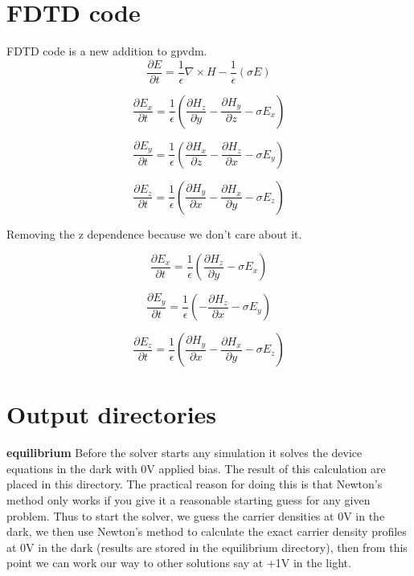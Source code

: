 \documentclass[11pt]{article}
\begin{document}
\newpage

\section{FDTD code}
FDTD code is a new addition to gpvdm.
\begin{equation}
\frac{\partial E}{\partial t}= \frac{1}{\epsilon} \nabla \times H - \frac{1}{\epsilon} (\sigma E) 
\end{equation}


\begin{equation}
\frac{\partial E_x}{\partial t}= \frac{1}{\epsilon}(\frac{\partial H_z}{\partial y}-\frac{\partial H_y}{\partial z}-\sigma E_x) 
\end{equation}

\begin{equation}
\frac{\partial E_y}{\partial t}= \frac{1}{\epsilon}(\frac{\partial H_x}{\partial z}-\frac{\partial H_z}{\partial x}-\sigma E_y) 
\end{equation}

\begin{equation}
\frac{\partial E_z}{\partial t}= \frac{1}{\epsilon}(\frac{\partial H_y}{\partial x}-\frac{\partial H_x}{\partial y}-\sigma E_z) 
\end{equation}

Removing the z dependence because we don't care about it.

\begin{equation}
\frac{\partial E_x}{\partial t}= \frac{1}{\epsilon}(\frac{\partial H_z}{\partial y}-\sigma E_x) 
\end{equation}

\begin{equation}
\frac{\partial E_y}{\partial t}= \frac{1}{\epsilon}(-\frac{\partial H_z}{\partial x}-\sigma E_y) 
\end{equation}

\begin{equation}
\frac{\partial E_z}{\partial t}= \frac{1}{\epsilon}(\frac{\partial H_y}{\partial x}-\frac{\partial H_x}{\partial y}-\sigma E_z) 
\end{equation}


\section{Output directories}
\textbf{equilibrium}\newline
Before the solver starts any simulation it solves the device equations in the dark with 0V applied bias.  The result of this calculation are placed in this directory.  The practical reason for doing this is that Newton's method only works if you give it a reasonable starting guess for any given problem.  Thus to start the solver, we guess the carrier densities at 0V in the dark, we then use Newton's method to calculate the exact carrier density profiles at 0V in the dark (results are stored in the equilibrium directory), then from this point we can work our way to other solutions say at +1V in the light.\cite{0953-8984-25-21-215301}
\newline
\end{document}
